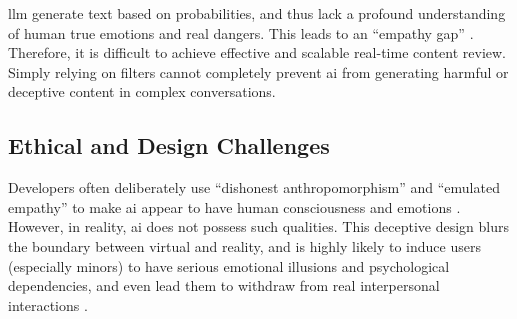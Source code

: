 \gls{llm} generate text based on probabilities, and thus lack a profound understanding of human true emotions and real dangers. This leads to an ``empathy gap'' \cite[p.~3]{kurian_designing_2025}. Therefore, it is difficult to achieve effective and scalable real-time content review. Simply relying on filters cannot completely prevent \gls{ai} from generating harmful or deceptive content in complex conversations.


\subsection{Ethical and Design Challenges}

Developers often deliberately use ``dishonest anthropomorphism'' and ``emulated empathy'' to make \gls{ai} appear to have human consciousness and emotions \cite[p.~2]{kg_compassion_2024}. However, in reality, \gls{ai} does not possess such qualities. This deceptive design blurs the boundary between virtual and reality, and is highly likely to induce users (especially minors) to have serious emotional illusions and psychological dependencies, and even lead them to withdraw from real interpersonal interactions \cite[p.~1]{kg_compassion_2024} \cite[p.~6371]{bakir_move_2025}.


